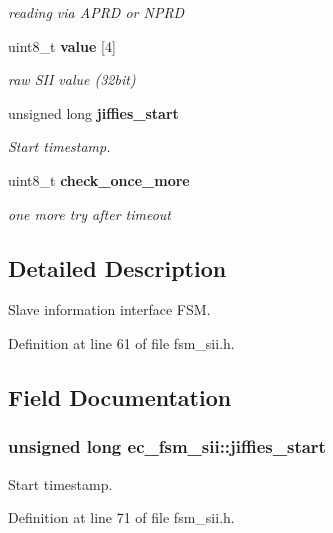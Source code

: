\begin{DoxyCompactItemize}
\begin{DoxyCompactList}\small\item\em reading via \-A\-P\-R\-D or \-N\-P\-R\-D \end{DoxyCompactList}\item 
uint8\-\_\-t {\bf value} [4]\label{structec__fsm__sii_ac95eca9edba43bc2e9e6354a35f6cd77}

\begin{DoxyCompactList}\small\item\em raw \-S\-I\-I value (32bit) \end{DoxyCompactList}\item 
unsigned long {\bf jiffies\-\_\-start}
\begin{DoxyCompactList}\small\item\em \-Start timestamp. \end{DoxyCompactList}\item 
uint8\-\_\-t {\bf check\-\_\-once\-\_\-more}\label{structec__fsm__sii_aa42a961a6e212bced0051dbf569b47c3}

\begin{DoxyCompactList}\small\item\em one more try after timeout \end{DoxyCompactList}\end{DoxyCompactItemize}


\subsection{\-Detailed \-Description}
\-Slave information interface \-F\-S\-M. 

\-Definition at line 61 of file fsm\-\_\-sii.\-h.



\subsection{\-Field \-Documentation}
\subsubsection[{jiffies\-\_\-start}]{\setlength{\rightskip}{0pt plus 5cm}unsigned long {\bf ec\-\_\-fsm\-\_\-sii\-::jiffies\-\_\-start}}\label{structec__fsm__sii_ab7f2a8187c72c4dcd08235b1533062b5}


\-Start timestamp. 



\-Definition at line 71 of file fsm\-\_\-sii.\-h.

